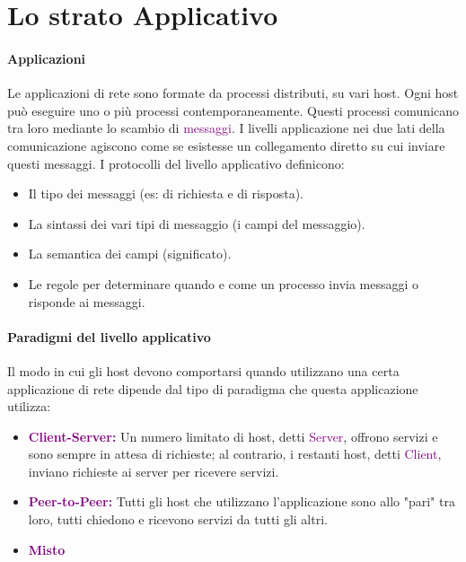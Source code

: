 \section{Lo strato Applicativo}
\paragraph{Applicazioni} 
Le applicazioni di rete sono formate da processi distributi, su vari host. Ogni host può eseguire uno o più processi contemporaneamente. Questi processi comunicano tra loro mediante lo scambio di \textcolor{purple}{messaggi}.
\newline I livelli applicazione nei due lati della comunicazione agiscono come se esistesse un collegamento diretto su cui inviare questi messaggi.
\newline I protocolli del livello applicativo definicono:
\begin{itemize}
    \item Il tipo dei messaggi (es: di richiesta e di risposta).
    \item La sintassi dei vari tipi di messaggio (i campi del messaggio).
    \item La semantica dei campi (significato).
    \item Le regole per determinare quando e come un processo invia messaggi o risponde ai messaggi.
\end{itemize}

\paragraph{Paradigmi del livello applicativo} Il modo in cui gli host devono comportarsi quando utilizzano una certa applicazione di rete dipende dal tipo di paradigma che questa applicazione utilizza:
\begin{itemize}
    \item \textbf{\textcolor{purple}{Client-Server:}} Un numero limitato di host, detti \textcolor{purple}{Server}, offrono servizi e sono sempre in attesa di richieste; al contrario, i restanti host, detti \textcolor{purple}{Client}, inviano richieste ai server per ricevere servizi.
    \item \textbf{\textcolor{purple}{Peer-to-Peer:}} Tutti gli host che utilizzano l'applicazione sono allo "pari" tra loro, tutti chiedono e ricevono servizi da tutti gli altri.
    \item \textbf{\textcolor{purple}{Misto}}
\end{itemize}

